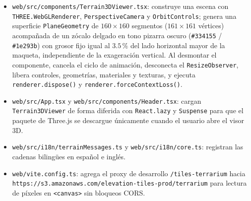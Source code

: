 \documentclass[11pt,a4paper]{article}
\begin{document}
\begin{itemize}
  \begin{equation}
    s_{\mathrm{rad}} = z_x l_x + z_y l_y.
  \end{equation}
  Cada celda se clasifica en:
  \begin{enumerate}
    \item \emph{Layover / escorzo severo} (\texttt{\#EF4444}): $s_{\mathrm{rad}} \ge \tan\theta_i$.
    \item \emph{Sombra radar} (\texttt{\#1E1B4B}): $-s_{\mathrm{rad}} \ge \tan(90^\circ - \theta_i)$.
    \item \emph{Pendiente cr\'itica} (\texttt{\#F59E0B}): $\tan\alpha > \tan 15^\circ$ sin layover ni sombra.
    \item \emph{Confiable} (\texttt{\#22C55E}): $\alpha \le 15^\circ$ sin layover ni sombra.
  \end{enumerate}
  \item \texttt{web/src/components/Terrain3DViewer.tsx}: construye una escena con \texttt{THREE.WebGLRenderer}, \texttt{PerspectiveCamera} y \texttt{OrbitControls}; genera una superficie \texttt{PlaneGeometry} de $160 \times 160$ segmentos ($161 \times 161$ v\'ertices) acompa\~nada de un z\'ocalo delgado en tono pizarra oscuro (\texttt{\#334155} / \texttt{\#1e293b}) con grosor fijo igual al $3.5\,\%$ del lado horizontal mayor de la maqueta, independiente de la exageraci\'on vertical. Al desmontar el componente, cancela el ciclo de animaci\'on, desconecta el \texttt{ResizeObserver}, libera controles, geometr\'ias, materiales y texturas, y ejecuta \texttt{renderer.dispose()} y \texttt{renderer.forceContextLoss()}.
  \item \texttt{web/src/App.tsx} y \texttt{web/src/components/Header.tsx}: cargan \texttt{Terrain3DViewer} de forma diferida con \texttt{React.lazy} y \texttt{Suspense} para que el paquete de Three.js se descargue \'unicamente cuando el usuario abre el visor 3D.
  \item \texttt{web/src/i18n/terrainMessages.ts} y \texttt{web/src/i18n/core.ts}: registran las cadenas biling\"ues en espa\~nol e ingl\'es.
  \item \texttt{web/vite.config.ts}: agrega el proxy de desarrollo \texttt{/tiles-terrarium} hacia \texttt{https://s3.amazonaws.com/elevation-tiles-prod/terrarium} para lectura de p\'ixeles en \texttt{<canvas>} sin bloqueos CORS.
\end{itemize}
\end{document}
